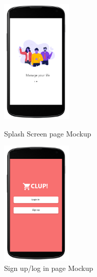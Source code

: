 \begin{figure}[H]
  \centering
  \includegraphics[width=0.3\textwidth,keepaspectratio]{images/4.png}
  \caption{Splash Screen page Mockup}
  \centering
  \includegraphics[width=0.3\textwidth,keepaspectratio]{images/5.png}
  \caption{Sign up/log in page Mockup}
\end{figure}
